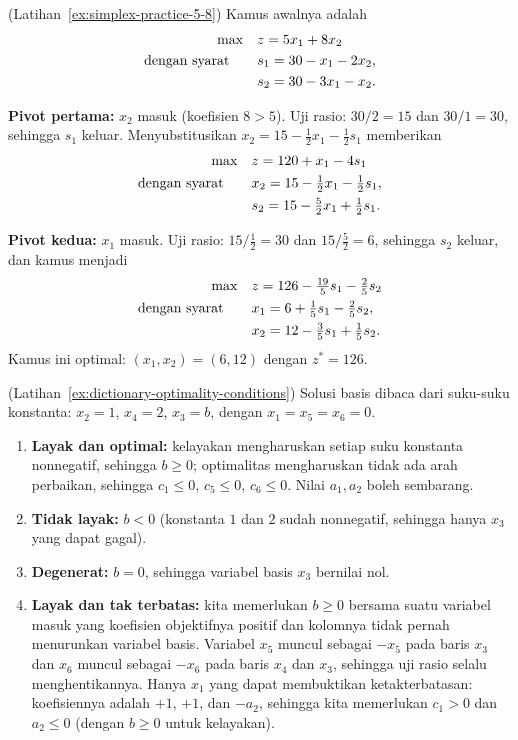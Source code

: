 \begin{solution}(Latihan~\ref{ex:simplex-practice-5-8})
Kamus awalnya adalah
\[
\begin{aligned}
\max\quad & z = 5x_1 + 8x_2 \\
\mbox{dengan syarat}\quad\quad & s_1 = 30 - x_1 - 2x_2, \\
         & s_2 = 30 - 3x_1 - x_2.
\end{aligned}
\]

\textbf{Pivot pertama:} $x_2$ masuk (koefisien $8 > 5$). Uji rasio: $30/2 = 15$ dan $30/1 = 30$, sehingga $s_1$ keluar. Menyubstitusikan $x_2 = 15 - \tfrac12 x_1 - \tfrac12 s_1$ memberikan
\[
\begin{aligned}
\max\quad & z = 120 + x_1 - 4s_1 \\
\mbox{dengan syarat}\quad\quad & x_2 = 15 - \tfrac12 x_1 - \tfrac12 s_1, \\
         & s_2 = 15 - \tfrac52 x_1 + \tfrac12 s_1.
\end{aligned}
\]

\textbf{Pivot kedua:} $x_1$ masuk. Uji rasio: $15/\tfrac12 = 30$ dan $15/\tfrac52 = 6$, sehingga $s_2$ keluar, dan kamus menjadi
\[
\begin{aligned}
\max\quad & z = 126 - \tfrac{19}{5} s_1 - \tfrac{2}{5} s_2 \\
\mbox{dengan syarat}\quad\quad & x_1 = 6 + \tfrac15 s_1 - \tfrac25 s_2, \\
         & x_2 = 12 - \tfrac35 s_1 + \tfrac15 s_2.
\end{aligned}
\]
Kamus ini optimal: $(x_1, x_2) = (6, 12)$ dengan $z^* = 126$.
\end{solution}
\vspace{1cm}

\begin{solution}(Latihan~\ref{ex:dictionary-optimality-conditions})
Solusi basis dibaca dari suku-suku konstanta: $x_2 = 1$, $x_4 = 2$, $x_3 = b$, dengan $x_1 = x_5 = x_6 = 0$.

\begin{enumerate}
\item \textbf{Layak dan optimal:} kelayakan mengharuskan setiap suku konstanta nonnegatif, sehingga $b \geq 0$; optimalitas mengharuskan tidak ada arah perbaikan, sehingga $c_1 \leq 0$, $c_5 \leq 0$, $c_6 \leq 0$. Nilai $a_1, a_2$ boleh sembarang.
\item \textbf{Tidak layak:} $b < 0$ (konstanta $1$ dan $2$ sudah nonnegatif, sehingga hanya $x_3$ yang dapat gagal).
\item \textbf{Degenerat:} $b = 0$, sehingga variabel basis $x_3$ bernilai nol.
\item \textbf{Layak dan tak terbatas:} kita memerlukan $b \geq 0$ bersama suatu variabel masuk yang koefisien objektifnya positif dan kolomnya tidak pernah menurunkan variabel basis. Variabel $x_5$ muncul sebagai $-x_5$ pada baris $x_3$ dan $x_6$ muncul sebagai $-x_6$ pada baris $x_4$ dan $x_3$, sehingga uji rasio selalu menghentikannya. Hanya $x_1$ yang dapat membuktikan ketakterbatasan: koefisiennya adalah $+1$, $+1$, dan $-a_2$, sehingga kita memerlukan $c_1 > 0$ dan $a_2 \leq 0$ (dengan $b \geq 0$ untuk kelayakan).
\end{enumerate}
\end{solution}
\vspace{1cm}

